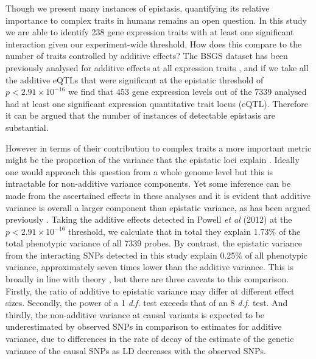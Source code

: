 \documentclass{article}
\begin{document}
Though we present many instances of epistasis, quantifying its relative importance to complex traits in humans remains an open question. In this study we are able to identify 238 gene expression traits with at least one significant interaction given our experiment-wide threshold. How does this compare to the number of traits controlled by additive effects? The BSGS dataset has been previously analysed for additive effects at all expression traits \cite{Powell2012}, and if we take all the additive eQTLs that were significant at the epistatic threshold of $p < 2.91 \times 10^{-16}$ we find that 453 gene expression levels out of the 7339 analysed had at least one significant expression quantitative trait locus (eQTL). Therefore it can be argued that the number of instances of detectable epistasis are substantial.

However in terms of their contribution to complex traits a more important metric might be the proportion of the variance that the epistatic loci explain \cite{Hill2008a}. Ideally one would approach this question from a whole genome level \cite{Visscher2008} but this is intractable for non-additive variance components. Yet some inference can be made from the ascertained effects in these analyses and it is evident that additive variance is overall a larger component than epistatic variance, as has been argued previously \cite{Hill2008a, Crow2010}. Taking the additive effects detected in Powell \emph{et al} (2012) at the $p < 2.91 \times 10^{-16}$ threshold, we calculate that in total they explain 1.73\% of the total phenotypic variance of all 7339 probes. By contrast, the epistatic variance from the interacting SNPs detected in this study explain 0.25\% of all phenotypic variance, approximately seven times lower than the additive variance. This is broadly in line with theory \cite{Hill2008a}, but there are three caveats to this comparison. Firstly, the ratio of additive to epistatic variance may differ at different effect sizes. Secondly, the power of a 1 \emph{d.f.} test exceeds that of an 8 \emph{d.f.} test. And thirdly, the non-additive variance at causal variants is expected to be underestimated by observed SNPs in comparison to estimates for additive variance, due to differences in the rate of decay of the estimate of the genetic variance of the causal SNPs as LD decreases with the observed SNPs.
\end{document}
